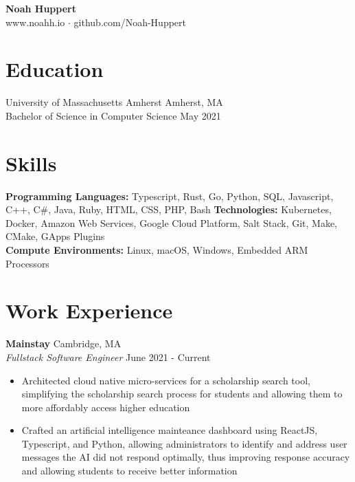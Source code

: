 \documentclass[10pt]{article}
\begin{document}

\centering
	\textbf{Noah Huppert} \\
	
	www.noahh.io $\cdot$ github.com/Noah-Huppert


\begin{flushleft}

\section{Education}
	University of Massachusetts Amherst \hfill Amherst, MA \\
	Bachelor of Science in Computer Science \hfill May 2021 \\

\section{Skills}
    \textbf{Programming Languages:} Typescript, Rust, Go, Python, SQL, Javascript, C++, C\#, Java, Ruby, HTML, CSS, PHP, Bash
	\textbf{Technologies:} Kubernetes, Docker, Amazon Web Services, Google Cloud Platform, Salt Stack, Git, Make, CMake, GApps Plugins \\
	\textbf{Compute Environments:} Linux, macOS, Windows, Embedded ARM Processors

    \section{Work Experience}
	\textbf{Mainstay} \hfill Cambridge, MA \\
	\textit{Fullstack Software Engineer} \hfill June 2021 - Current \\
    \begin{itemize}
        \item Architected cloud native micro-services for a scholarship search tool, simplifying the scholarship search process for students and allowing them to more affordably access higher education

		\item Crafted an artificial intelligence mainteance dashboard using ReactJS, Typescript, and Python, allowing administrators to identify and address user messages the AI did not respond optimally, thus improving response accuracy and allowing students to receive better information


\end{itemize}
\end{flushleft}
\end{document}
